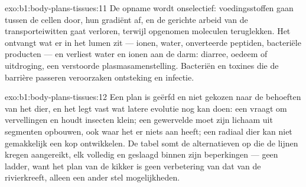 \begin{solution}{exo:b1:body-plans-tissues:11}
De opname wordt onselectief: voedingsstoffen gaan tussen de cellen door, hun
gradiënt af, en de gerichte arbeid van de transporteiwitten gaat verloren,
terwijl opgenomen moleculen teruglekken. Het  ontvangt wat er in
het lumen zit --- ionen, water, onverteerde peptiden, bacteriële producten ---
en verliest water en ionen aan de darm: diarree, oedeem of uitdroging, een
verstoorde plasmasamenstelling. Bacteriën en toxines die de barrière passeren
veroorzaken ontsteking en infectie.
\end{solution}

\begin{solution}{exo:b1:body-plans-tissues:12}
Een plan is geërfd en niet gekozen naar de behoeften van het dier, en het legt
vast wat latere evolutie nog kan doen: een  vraagt om vervellingen en
houdt insecten klein; een gewervelde moet zijn lichaam uit segmenten opbouwen,
ook waar het er niets aan heeft; een radiaal dier kan niet gemakkelijk een kop
ontwikkelen. De tabel somt de alternatieven op die de lijnen kregen aangereikt,
elk volledig en geslaagd binnen zijn beperkingen --- geen ladder, want het plan
van de kikker is geen verbetering van dat van de rivierkreeft, alleen een ander
stel mogelijkheden.
\end{solution}

